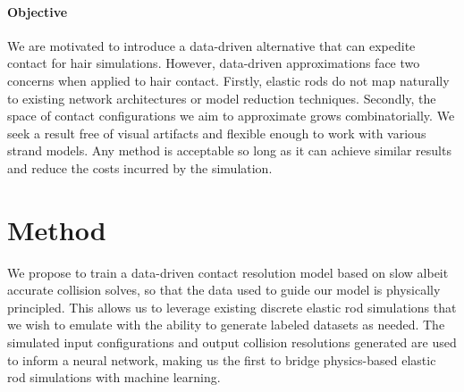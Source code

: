 \documentclass[12pt]{report}
\begin{document}
\paragraph{Objective}
We are motivated to introduce a data-driven alternative that 
can expedite contact for hair simulations.
However, data-driven approximations face two concerns when
applied to hair contact.
Firstly, elastic rods do not map naturally to existing network architectures
or model reduction techniques.
Secondly, the space of contact configurations we aim to approximate grows combinatorially.
We seek a result free of visual artifacts and flexible enough
to work with various strand models.
Any method is acceptable so long as it can
achieve similar results and reduce the costs incurred by the simulation.

\section{Method}\label{sec:hair}
We propose to train a data-driven contact resolution model based on slow albeit
accurate collision solves, so that the data used to guide our model is physically principled.
This allows us to leverage existing discrete elastic rod simulations 
that we wish to emulate with the ability to generate labeled datasets as needed.
The simulated input configurations and output collision resolutions 
generated are used to inform a neural network, 
making us the first to bridge physics-based elastic rod simulations with machine learning.
\end{document}
